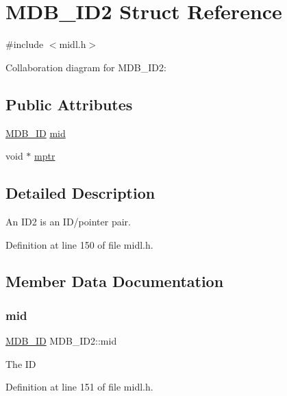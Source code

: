 \hypertarget{struct_m_d_b___i_d2}{}\section{M\+D\+B\+\_\+\+I\+D2 Struct Reference}
\label{struct_m_d_b___i_d2}


{\ttfamily \#include $<$midl.\+h$>$}



Collaboration diagram for M\+D\+B\+\_\+\+I\+D2\+:
\subsection*{Public Attributes}
\begin{DoxyCompactItemize}
\item 
\mbox{\hyperlink{group__idls_ga792192229a977c49f083846b5635f92d}{M\+D\+B\+\_\+\+ID}} \mbox{\hyperlink{struct_m_d_b___i_d2_a761ed12fed2327d04af6b9e841335833}{mid}}
\item 
void $\ast$ \mbox{\hyperlink{struct_m_d_b___i_d2_af23b32045b25744304bee13ac3ea8794}{mptr}}
\end{DoxyCompactItemize}


\subsection{Detailed Description}
An I\+D2 is an I\+D/pointer pair. 

Definition at line 150 of file midl.\+h.



\subsection{Member Data Documentation}
\mbox{\label{struct_m_d_b___i_d2_a761ed12fed2327d04af6b9e841335833}} 
\subsubsection{\texorpdfstring{mid}{mid}}
{\footnotesize\ttfamily \mbox{\hyperlink{group__idls_ga792192229a977c49f083846b5635f92d}{M\+D\+B\+\_\+\+ID}} M\+D\+B\+\_\+\+I\+D2\+::mid}

The ID 

Definition at line 151 of file midl.\+h.


